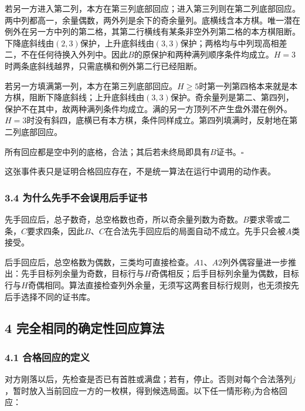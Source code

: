 \documentclass[
  a4paper,
]{article}
\begin{document}
若另一方进入第二列，本方在第三列底部回应；进入第三列则在第二列底部回应。两中列都高一，余量偶数，两外列是余下的奇余量列。底横线含本方棋。唯一潜在例外在另一方中列的第二格，其第二行横线有某条非空外列第二格的本方棋阻断。下降底斜线由\((2,3)\)保护，上升底斜线由\((3,3)\)保护；两格均与中列现高相差二，不在任何待换入外列中。因此\(B\)的原保护和两种满列顺序条件均成立。\(H=3\)时两条底斜线越界，只需底横和例外第二行已经阻断。

若另一方填满第一列，本方在第三列底部回应。\(H\ge 5\)时第一列第四格本来就是本方棋，阻断下降底斜线；上升底斜线由\((3,3)\)保护。奇余量列是第二、第四列，保护不在其中，故两种满列条件均成立。满的另一方顶列不产生盘外潜在例外。\(H=3\)时没有斜四，底横已有本方棋，条件同样成立。第四列填满时，反射地在第二列底部回应。

所有回应都是空中列的底格，合法；其后若未终局即具有\(B\)证书。\(\square\)

这张事件表只是证明合格回应存在，不是统一算法在运行中调用的动作表。

\subsubsection{3.4
为什么先手不会误用后手证书}\label{ux4e3aux4ec0ux4e48ux5148ux624bux4e0dux4f1aux8befux7528ux540eux624bux8bc1ux4e66}

先手回应后，总子数奇，总空格数也奇，所以奇余量列数为奇数。\(B\)要求零或二条，\(C\)要求四条，因此\(B\)、\(C\)在合法先手回应后的局面自动不成立。先手只会被\(A\)类接受。

后手回应后，总空格数为偶数，三类均可直接检查。\(A1\)、\(A2\)列外偶容量进一步推出：先手目标列余量为奇数，目标行与\(H\)奇偶相反；后手目标列余量为偶数，目标行与\(H\)奇偶相同。算法直接检查列外余量，无须写这两套目标行规则，也无须按先后手选择不同的证书库。

\subsection{4
完全相同的确定性回应算法}\label{ux5b8cux5168ux76f8ux540cux7684ux786eux5b9aux6027ux56deux5e94ux7b97ux6cd5}

\subsubsection{4.1
合格回应的定义}\label{ux5408ux683cux56deux5e94ux7684ux5b9aux4e49}

对方刚落以后，先检查是否已有首胜或满盘；若有，停止。否则对每个合法落列\(j\)，暂时放入当前回应一方的一枚棋，得到候选局面。以下任一情形称\(j\)为合格回应：
\end{document}
